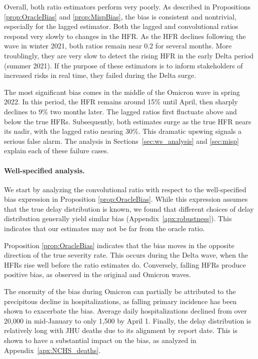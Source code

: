\documentclass{article}
\newcommand{\djmcomment}[1]{{\color{teal}[DJM: #1]}}
\begin{document}
Overall, both ratio estimators perform very poorly. 
As described in Propositions \ref{prop:OracleBias} and \ref{prop:MispBias}, the bias is consistent and nontrivial, especially for the lagged estimator.
Both the lagged and convolutional ratios respond very slowly to
changes in the HFR. As the HFR declines following the wave in winter 2021, both
ratios remain near 0.2 for several months. More troublingly, they are very slow
to detect the rising HFR in the early Delta period (summer 2021). %
If the purpose of these estimators is to inform stakeholders of increased risks
in real time, they failed during the Delta surge.

The most significant bias comes in the middle of the Omicron wave in spring 2022. 
In this period, the HFR remains around 15\% until April, then sharply declines to 9\% two months later. The lagged ratios first fluctuate above and below the true HFRs. Subsequently, both estimates surge as the true HFR nears its nadir, with the lagged ratio nearing 30\%. This dramatic upswing signals a serious false alarm. 
The analysis in Sections~\ref{sec:ws_analysis} and \ref{sec:misp} explain each
of these failure cases. 

\paragraph{Well-specified analysis.}
We start by analyzing the convolutional ratio with
respect to the well-specified bias expression in Proposition \ref{prop:OracleBias}.
While this expression assumes that the true delay distribution is known, we found
that different choices of delay distribution generally yield similar bias
(Appendix~\ref{apx:robustness}). This indicates that our estimates may not be far
from the oracle ratio.

Proposition \ref{prop:OracleBias} indicates that the bias moves in the opposite direction of the true severity rate. This occurs during the Delta wave, when the HFRs rise well before the ratio estimates do. Conversely, falling HFRs produce positive bias, as observed in the original and Omicron waves.

The enormity of the bias during Omicron can partially be attributed to the precipitous decline in hospitalizations, as falling primary incidence has been shown to exacerbate the bias. Average daily hospitalizations declined from over 20,000 in mid-January to only 1,500 by April 1. 
Finally, the delay distribution is relatively long with JHU deaths due to its alignment by report date. This is shown to have a substantial impact on the bias, as analyzed in Appendix~\ref{apx:NCHS_deaths}.
\end{document}
